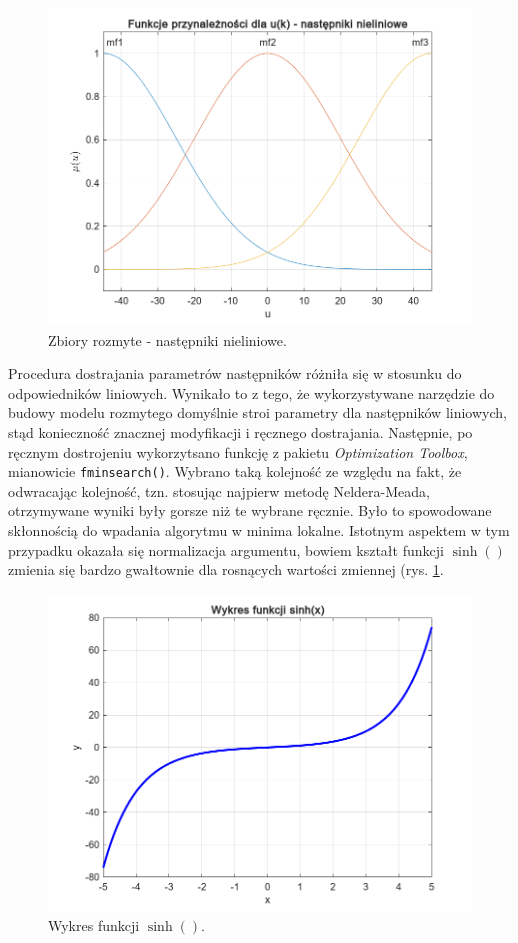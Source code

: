 \begin{figure}[h!]
\centering
\includegraphics[width=\textwidth]{pictures/hamm_nonlinearFis}
\caption{Zbiory rozmyte - następniki nieliniowe.}
\end{figure}

\newpage

Procedura dostrajania parametrów następników różniła się w stosunku do odpowiedników liniowych. Wynikało to z tego, że wykorzystywane narzędzie do budowy modelu rozmytego domyślnie stroi parametry dla następników liniowych, stąd konieczność znacznej modyfikacji i ręcznego dostrajania. Następnie, po ręcznym dostrojeniu wykorzytsano funkcję z pakietu \textit{Optimization Toolbox}, mianowicie \verb+fminsearch()+. Wybrano taką kolejność ze względu na fakt, że odwracając kolejność, tzn. stosując najpierw metodę Neldera-Meada, otrzymywane wyniki były gorsze niż te wybrane ręcznie. Było to spowodowane skłonnością do wpadania algorytmu w minima lokalne. Istotnym aspektem w tym przypadku okazała się normalizacja argumentu, bowiem kształt funkcji $\sinh()$ zmienia się bardzo gwałtownie dla rosnących wartości zmiennej (rys. {\ref{sinh}}. 

\begin{figure}[h!]
\centering
\includegraphics[width=\textwidth]{pictures/sinh}
\caption{Wykres funkcji $\sinh()$.}
\label{sinh}
\end{figure}

